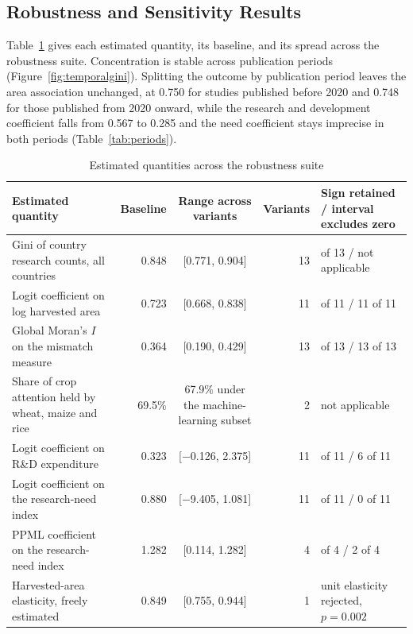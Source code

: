 \documentclass[ASNA,twocolumn]{USG}
\begin{document}
\subsection{Robustness and Sensitivity Results}

Table~\ref{tab:robust} gives each estimated quantity, its baseline, and its spread across the
robustness suite. Concentration is stable across publication periods (Figure~\ref{fig:temporalgini}). Splitting
the outcome by publication period leaves the area association unchanged, at 0.750 for studies
published before 2020 and 0.748 for those published from 2020 onward, while the research and development coefficient falls from 0.567 to 0.285 and the need
coefficient stays imprecise in both periods (Table~\ref{tab:periods}).

\begin{table}[!t]
\centering
\footnotesize
\caption{Estimated quantities across the robustness suite}
\label{tab:robust}
\begin{tabular}{@{}>{\raggedright\arraybackslash}p{5.1cm} r c r >{\raggedright\arraybackslash}p{3.9cm}@{}}
\toprule
Estimated quantity & Baseline & Range across variants & Variants & Sign retained / interval excludes zero \\
\midrule
Gini of country research counts, all countries & 0.848 & [0.771, 0.904] & 13 & 13 of 13 / not applicable \\
Logit coefficient on log harvested area & 0.723 & [0.668, 0.838] & 11 & 11 of 11 / 11 of 11 \\
Global Moran's $I$ on the mismatch measure & 0.364 & [0.190, 0.429] & 13 & 13 of 13 / 13 of 13 \\
Share of crop attention held by wheat, maize and rice & 69.5\% & 67.9\% under the machine-learning subset & 2 & not applicable \\
Logit coefficient on R\&D expenditure & 0.323 & [$-$0.126, 2.375] & 11 & 10 of 11 / 6 of 11 \\
Logit coefficient on the research-need index & 0.880 & [$-$9.405, 1.081] & 11 & 10 of 11 / 0 of 11 \\
PPML coefficient on the research-need index & 1.282 & [0.114, 1.282] & 4 & 4 of 4 / 2 of 4 \\
Harvested-area elasticity, freely estimated & 0.849 & [0.755, 0.944] & 1 & unit elasticity rejected, $p=0.002$ \\
\bottomrule
\end{tabular}
\begin{tablenotes}

\end{tablenotes}
\end{table}
\end{document}
